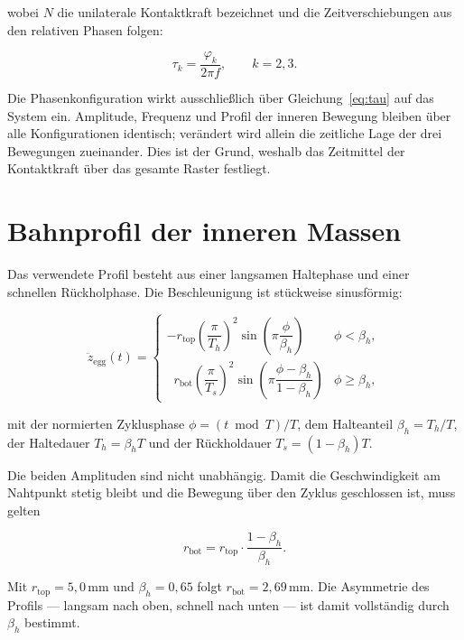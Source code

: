 \documentclass[12pt,a4paper]{report}
\begin{document}
wobei $N$ die unilaterale Kontaktkraft bezeichnet und die
Zeitverschiebungen aus den relativen Phasen folgen:

\begin{equation}
\tau_k = \frac{\varphi_k}{2\pi f}, \qquad k = 2,3.
\label{eq:tau}
\end{equation}

Die Phasenkonfiguration wirkt ausschließlich über
Gleichung~\eqref{eq:tau} auf das System ein. Amplitude, Frequenz und
Profil der inneren Bewegung bleiben über alle Konfigurationen identisch;
verändert wird allein die zeitliche Lage der drei Bewegungen zueinander.
Dies ist der Grund, weshalb das Zeitmittel der Kontaktkraft über das
gesamte Raster festliegt.

\section{Bahnprofil der inneren Massen}

Das verwendete Profil besteht aus einer langsamen Haltephase und einer
schnellen Rückholphase. Die Beschleunigung ist stückweise sinusförmig:

\begin{equation}
\ddot{z}_{\mathrm{egg}}(t) =
\begin{cases}
-r_{\mathrm{top}}\left(\dfrac{\pi}{T_h}\right)^{2}
 \sin\!\left(\pi \dfrac{\phi}{\beta_h}\right)
 & \phi < \beta_h,\\[2.2ex]
\;\;r_{\mathrm{bot}}\left(\dfrac{\pi}{T_s}\right)^{2}
 \sin\!\left(\pi \dfrac{\phi-\beta_h}{1-\beta_h}\right)
 & \phi \geq \beta_h,
\end{cases}
\label{eq:eggprofil}
\end{equation}

mit der normierten Zyklusphase $\phi = (t \bmod T)/T$, dem Halteanteil
$\beta_h = T_h/T$, der Haltedauer $T_h = \beta_h T$ und der Rückholdauer
$T_s = (1-\beta_h)T$.

Die beiden Amplituden sind nicht unabhängig. Damit die Geschwindigkeit am
Nahtpunkt stetig bleibt und die Bewegung über den Zyklus geschlossen ist,
muss gelten

\begin{equation}
r_{\mathrm{bot}} = r_{\mathrm{top}} \cdot \frac{1-\beta_h}{\beta_h}.
\label{eq:c1}
\end{equation}

Mit $r_{\mathrm{top}} = 5{,}0\,\mathrm{mm}$ und $\beta_h = 0{,}65$ folgt
$r_{\mathrm{bot}} = 2{,}69\,\mathrm{mm}$. Die Asymmetrie des Profils ---
langsam nach oben, schnell nach unten --- ist damit vollständig durch
$\beta_h$ bestimmt.
\end{document}
